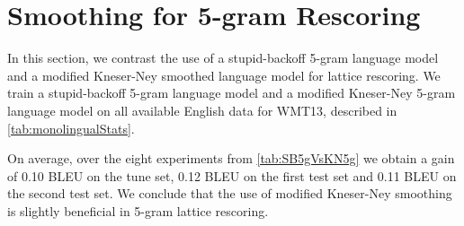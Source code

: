 
\section{Smoothing for 5-gram Rescoring}
\label{sec:sbVSkn}

In this section, we contrast the use of a stupid-backoff 5-gram
language model and a modified Kneser-Ney smoothed language model
for lattice rescoring. We train a stupid-backoff 5-gram language model
and a modified Kneser-Ney 5-gram language model on all available
English data for WMT13, described in \autoref{tab:monolingualStats}.

On average, over the eight experiments from \autoref{tab:SB5gVsKN5g}
we obtain a gain of 0.10 BLEU on the tune set, 0.12 BLEU on the first
test set and 0.11 BLEU on the second test set. We conclude that the
use of modified Kneser-Ney smoothing is slightly beneficial in 5-gram
lattice rescoring.

